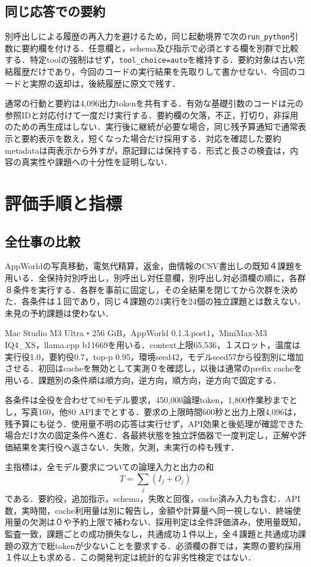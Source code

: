 \subsection{同じ応答での要約}
別呼出しによる履歴の再入力を避けるため，同じ起動境界で次の\texttt{run\_python}引数に要約欄を付ける．任意欄と，schema及び指示で必須とする欄を別群で比較する．特定toolの強制はせず，\texttt{tool\_choice=auto}を維持する．要約対象は古い完結履歴だけであり，今回のコードの実行結果を先取りして書かせない．今回のコードと実際の返却は，後続履歴に原文で残す．

通常の行動と要約は4,096出力tokenを共有する．有効な基礎引数のコードは元の参照IDと対応付けて一度だけ実行する．要約欄の欠落，不正，打切り，非採用のための再生成はしない．実行後に継続が必要な場合，同じ残予算通知で通常表示と要約表示を数え，短くなった場合だけ採用する．対応を確認した要約metadataは両表示から外すが，原記録には保持する．形式と長さの検査は，内容の真実性や課題への十分性を証明しない．

\section{評価手順と指標}
\subsection{全仕事の比較}
AppWorld\cite{appworld}の写真移動，電気代精算，返金，曲情報のCSV書出しの既知４課題を用いる．全保持対別呼出し，別呼出し対任意欄，別呼出し対必須欄の順に，各群８条件を実行する．各群を事前に固定し，その全結果を閉じてから次群を決めた．各条件は１回であり，同じ４課題の24実行を24個の独立課題とは数えない．未見の予約課題は使わない．

Mac Studio M3 Ultra・256 GiB，AppWorld 0.1.3.post1，MiniMax-M3 IQ4\_XS，llama.cpp b11669を用いる．context上限65,536，１スロット，温度は実行役1.0，要約役0.7，top-p 0.95，環境seed42，モデルseed57から役割別に増加させる．初回はcacheを無効として実測０を確認し，以後は通常のprefix cacheを用いる．課題別の条件順は順方向，逆方向，順方向，逆方向で固定する．

各条件は全役を合わせて80モデル要求，450,000論理token，1,800作業秒までとし，写真160，他80 APIまでとする．要求の上限時間600秒と出力上限4,096は，残予算にも従う．使用量不明の応答は実行せず，API効果と後処理が確認できた場合だけ次の固定条件へ進む．各最終状態を独立評価器で一度判定し，正解や評価結果を実行役へ返さない．失敗，欠測，未実行の枠も残す．

主指標は，全モデル要求についての論理入力と出力の和
\begin{equation}
 T=\sum_j (I_j+O_j)
\end{equation}
である．要約役，追加指示，schema，失敗と回復，cache済み入力も含む．API数，実時間，cache利用量は別に報告し，金額や計算量へ同一視しない．終端使用量の欠測は０や予約上限で補わない．採用判定は全件評価済み，使用量既知，監査一致，課題ごとの成功損失なし，共通成功１件以上，全４課題と共通成功課題の双方で総tokenが少ないことを要求する．必須欄の群では，実際の要約採用１件以上も求める．この開発判定は統計的な非劣性検定ではない．

